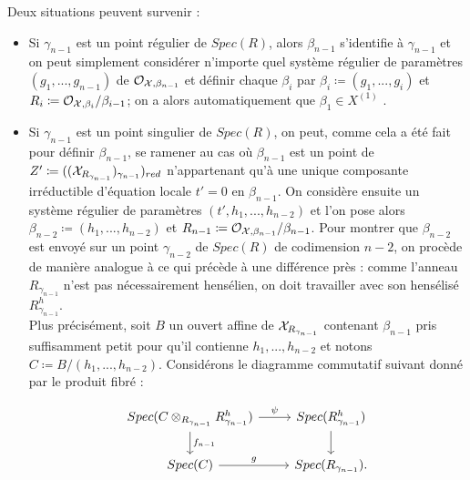 \documentclass[11pt]{article}
\begin{document}
Deux situations peuvent survenir :
\begin{itemize}
    \item Si $\gamma_{n-1}$ est un point régulier de $Spec(R)$, alors $\beta_{n-1}$ s'identifie à $\gamma_{n-1}$ et on peut simplement considérer n'importe quel système régulier de paramètres $(g_1,...,g_{n-1})$ de $\mathcal{O}_{\mathcal{X},\beta_{n-1}}$ et définir chaque $\beta_i$ par $\beta_i \coloneqq (g_1,...,g_{i})$ et $R_i \coloneqq \CO_{\CX,\beta_i}/\beta_{i-1}$; on a alors automatiquement que $\beta_1 \in X^{(1)}$ .
    \item Si $\gamma_{n-1}$ est un point singulier de $Spec(R)$, on peut, comme cela a été fait pour définir $\beta_{n-1}$, se ramener au cas où $\beta_{n-1}$ est un point de $Z' \coloneqq ((\CX_{R_{\gamma_{n-1}}})_{\gamma_{n-1}})_{red}$ n'appartenant qu'à une unique composante irréductible d'équation locale $t'=0$ en $\beta_{n-1}$. On considère ensuite un système régulier de paramètres $(t',h_1,...,h_{n-2})$ et l'on pose alors $\beta_{n-2} \coloneqq (h_1,...,h_{n-2})$ et $R_{n-1} \coloneqq \CO_{\CX,\beta_{n-1}}/\beta_{n-1}$. Pour montrer que $\beta_{n-2}$ est envoyé sur un point $\gamma_{n-2}$ de $Spec(R)$ de codimension $n-2$, on procède de manière analogue à ce qui précède à une différence près : comme l'anneau $R_{\gamma_{n-1}}$ n'est pas nécessairement hensélien, on doit travailler avec son hensélisé $R_{\gamma_{n-1}}^h$.\\

Plus précisément, soit $B$ un ouvert affine de $\mathcal{X}_{R_{\gamma_{n-1}}}$ contenant $\beta_{n-1}$ pris suffisamment petit pour qu'il contienne $h_1,...,h_{n-2}$ et notons $C \coloneqq B/(h_1,...,h_{n-2})$. Considérons le diagramme commutatif suivant donné par le produit fibré :

\begin{equation}
\begin{tikzcd}
    Spec(C \otimes_{R_{\gamma_{n-1}}} R_{\gamma_{n-1}}^h) & Spec(R_{\gamma_{n-1}}^h) \\
    Spec(C) & Spec(R_{\gamma_{n-1}}). \\
\arrow[from=1-1, to=1-2, "\psi"]
\arrow[from=1-1, to=2-1, "f_{n-1}"]
\arrow[from=1-2, to=2-2]
\arrow[from=2-1, to=2-2, "g"]
\end{tikzcd}
\end{equation}



\end{itemize}
\end{document}
